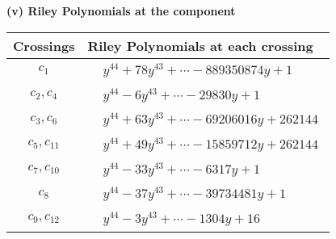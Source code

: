 \documentclass[1p]{elsarticle_modified}
\theoremstyle{definition}
\begin{document}
\flushleft \textbf{(v) Riley Polynomials at the component}\newline \\
\begin{tabular}{m{50pt}|m{274pt}}
Crossings & \hspace{64pt}Riley Polynomials at each crossing \\
\hline $$\begin{aligned}c_{1}\end{aligned}$$&$\begin{aligned}
&y^{44}+78 y^{43}+\cdots-889350874 y+1
\end{aligned}$\\
\hline $$\begin{aligned}c_{2},c_{4}\end{aligned}$$&$\begin{aligned}
&y^{44}-6 y^{43}+\cdots-29830 y+1
\end{aligned}$\\
\hline $$\begin{aligned}c_{3},c_{6}\end{aligned}$$&$\begin{aligned}
&y^{44}+63 y^{43}+\cdots-69206016 y+262144
\end{aligned}$\\
\hline $$\begin{aligned}c_{5},c_{11}\end{aligned}$$&$\begin{aligned}
&y^{44}+49 y^{43}+\cdots-15859712 y+262144
\end{aligned}$\\
\hline $$\begin{aligned}c_{7},c_{10}\end{aligned}$$&$\begin{aligned}
&y^{44}-33 y^{43}+\cdots-6317 y+1
\end{aligned}$\\
\hline $$\begin{aligned}c_{8}\end{aligned}$$&$\begin{aligned}
&y^{44}-37 y^{43}+\cdots-39734481 y+1
\end{aligned}$\\
\hline $$\begin{aligned}c_{9},c_{12}\end{aligned}$$&$\begin{aligned}
&y^{44}-3 y^{43}+\cdots-1304 y+16
\end{aligned}$\\
\hline
\end{tabular}\\~\\
\end{document}
